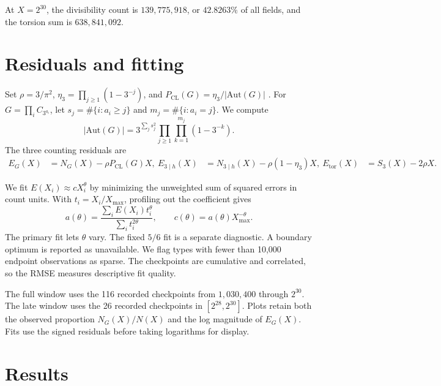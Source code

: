 \documentclass[11pt]{article}
\newcommand{\Aut}{\mathrm{Aut}}
\newcommand{\CL}{\mathrm{CL}}
\newcommand{\Ndiv}{N_{3\mid h}}
\begin{document}
At \(X=2^{30}\), the divisibility count is \(139{,}775{,}918\), or
\(42.8263\%\) of all fields, and the torsion sum is \(638{,}841{,}092\).

\section{Residuals and fitting}

Set \(\rho=3/\pi^2\), \(\eta_3=\prod_{j\ge1}(1-3^{-j})\), and
\(P_{\CL}(G)=\eta_3/|\Aut(G)|\) \cite{wood}. For
\(G=\prod_i C_{3^{a_i}}\), let \(s_j=\#\{i:a_i\ge j\}\) and
\(m_j=\#\{i:a_i=j\}\). We compute
\[
|\Aut(G)|=3^{\sum_j s_j^2}\prod_{j\ge1}\prod_{k=1}^{m_j}(1-3^{-k}).
\]
The three counting residuals are
\begin{align*}
E_G(X)&=N_G(X)-\rho P_{\CL}(G)X,\
E_{3\mid h}(X)&=\Ndiv(X)-\rho(1-\eta_3)X,\
E_{\mathrm{tor}}(X)&=S_3(X)-2\rho X.
\end{align*}

We fit \(E(X_i)\approx cX_i^\theta\) by minimizing the unweighted sum of
squared errors in count units. With \(t_i=X_i/X_{\max}\), profiling out the
coefficient gives
\[
a(\theta)=\frac{\sum_i E(X_i)t_i^\theta}{\sum_i t_i^{2\theta}},
\qquad
c(\theta)=a(\theta)X_{\max}^{-\theta}.
\]
The primary fit lets \(\theta\) vary. The fixed \(5/6\) fit is a separate
diagnostic. A boundary optimum is reported as unavailable. We flag types
with fewer than 10,000 endpoint observations as sparse. The checkpoints
are cumulative and correlated, so the RMSE measures descriptive fit quality.

The full window uses the 116 recorded checkpoints from \(1{,}030{,}400\)
through \(2^{30}\). The late window uses the 26 recorded checkpoints in
\([2^{28},2^{30}]\). Plots retain both the observed proportion
\(N_G(X)/N(X)\) and the log magnitude of \(E_G(X)\). Fits use the signed
residuals before taking logarithms for display.

\section{Results}
\end{document}
